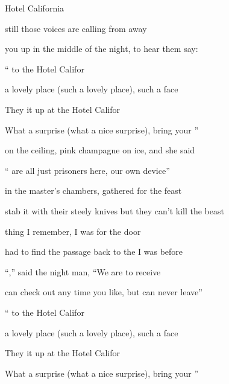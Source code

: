 \begin{SBSong}{Hotel California}
\begin{SBVerse}
     still those voices are calling from  away

     you up in the middle of the night,  to hear them say:
  \end{SBVerse}
  \CBPageBrk
  \begin{SBChorus}
    `` to the Hotel Califor

     a lovely place (such a lovely place), such a  face

    They  it up at the Hotel Califor

    What a  surprise (what a nice surprise), bring your ''
  \end{SBChorus}
  
  \begin{SBVerse}
     on the ceiling,  pink champagne on ice, and she said

    `` are all just prisoners here,  our own device''

     in the master's chambers,  gathered for the feast

     stab it with their steely knives \WBLineBrk but they  can't kill the beast

     thing I remember, I was  for the door

     had to find the passage back to the  I was before

    ``,'' said the night man, ``We are  to receive

     can check out any time you like, but  can never leave''
  \end{SBVerse}
    \begin{SBChorus}
    `` to the Hotel Califor

     a lovely place (such a lovely place), such a  face

    They  it up at the Hotel Califor

    What a  surprise (what a nice surprise), bring your ''  
  \end{SBChorus}
\end{SBSong}
